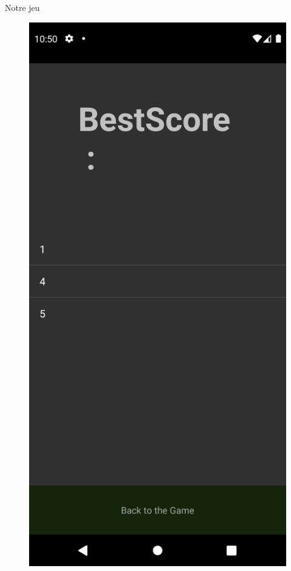 \documentclass{beamer}
\begin{document}
\begin{frame}{Notre jeu}
\begin{figure}[H]
    \begin{minipage}[H]{0.25\linewidth}
        \centering
        \includegraphics[scale=0.05]{LeaderBoard.png}
    \end{minipage}
    \end{figure}
\end{frame}
\end{document}
